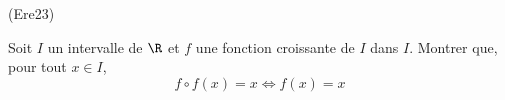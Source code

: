 \begin{tiny}(Ere23)\end{tiny} Soit $I$ un intervalle de $\R$ et $f$ une fonction croissante de $I$ dans $I$. Montrer que, pour tout $x\in I$,
\begin{displaymath}
 f\circ f(x) = x \Leftrightarrow f(x)=x
\end{displaymath}
 